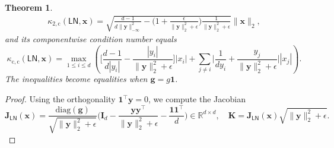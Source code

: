 \documentclass[namedate,webpdf,imanum]{ima-authoring-template}
\newcommand{\Real}{\mathbb{R}}
\newcommand{\Matrix}[1]{\mathbf{#1}}
\newcommand{\trans}{\intercal}
\newcommand{\diag}[2][]{\mathrm{diag}#1( #2 #1)}
\newcommand{\Norm}[3][]{#1\| #2 #1\|_{\mathrm{#3}}}
\newcommand{\One}{\Matrix{1}}
\newcommand{\Layer}[1]{\mathsf{#1}}
\newcommand{\cond}[3][]{\kappa_{\mathrm{#2}} #1( #3 #1)}
\newtheorem{theorem}{Theorem}[section]%
\numberwithin{equation}{section}
\begin{document}
\begin{theorem}
\begin{gather*}
    \cond{2,c}{\Layer{LN}, \Matrix{x}} = \sqrt{\frac{d-1}{d \Norm{\Matrix{y}}{-\infty}^2} - \bigg( 1 + \frac{\epsilon}{\Norm{\Matrix{y}}{2}^2 + \epsilon} \bigg) \frac{1}{\Norm{\Matrix{y}}{2}^2 + \epsilon}} \Norm{\Matrix{x}}{2},
\end{gather*}
and its componentwise condition number equals
\begin{equation*}
    \cond{c,c}{\Layer{LN}, \Matrix{x}} = \max_{1 \leq i \leq d} \left(  \bigg[\frac{d-1}{d |y_i|} - \frac{|y_i|}{\Norm{\Matrix{y}}{2}^2 + \epsilon} \bigg] |x_i| + \sum_{j \neq i} \bigg|\frac{1}{d y_i} + \frac{y_j}{\Norm{\Matrix{y}}{2}^2 + \epsilon} \bigg| |x_j| \right).
\end{equation*}
The inequalities become equalities when $\Matrix{g} = g \One$.
\end{theorem}
\begin{proof}
Using the orthogonality $\One^\trans \Matrix{y} = 0$, we compute the Jacobian
\begin{equation*}
    \Matrix{J}_{\Layer{LN}}(\Matrix{x}) = \frac{\diag{\Matrix{g}}}{\sqrt{\Norm{\Matrix{y}}{2}^2 + \epsilon}} \bigg( \Matrix{I}_d - \frac{\Matrix{y} \Matrix{y}^\trans}{\Norm{\Matrix{y}}{2}^2 + \epsilon} - \frac{\One \One^\trans}{d} \bigg) \in \Real^{d \times d}, \quad \Matrix{K} = \Matrix{J}_{\Layer{LN}}(\Matrix{x}) \sqrt{\Norm{\Matrix{y}}{2}^2 + \epsilon}.
\end{equation*}


\end{proof}
\end{document}
